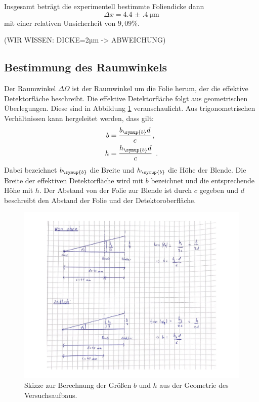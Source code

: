 Insgesamt beträgt die experimentell bestimmte Foliendicke dann
\begin{equation*}
  \Delta x = \SI{4.4(4)}{\micro\metre}
\end{equation*}
mit einer relativen Unsicherheit von $9{,}09\%$.

(WIR WISSEN: DICKE=2µm -> ABWEICHUNG)

\subsection{Bestimmung des Raumwinkels}
\label{subsec:raumwinkel}

Der Raumwinkel $\Delta \Omega$ ist der Raumwinkel um die Folie herum, der die
effektive Detektorfläche beschreibt. Die effektive Detektorfläche folgt aus geometrischen
Überlegungen. Diese sind in Abbildung \ref{fig:skizze} veranschaulicht.
Aus trigonometrischen Verhältnissen kann hergeleitet werden, dass gilt:
\begin{align*}
  b &= \frac{b_{\symup{b}} d}{c} \,,\\
  h &= \frac{h_{\symup{b}} d}{c} \,.
\end{align*}
Dabei bezeichnet $b_{\symup{b}}$ die Breite und $h_{\symup{b}}$ die Höhe der Blende.
Die Breite der effektiven Detektorfläche wird mit $b$ bezeichnet und die entsprechende Höhe mit $h$.
Der Abstand von der Folie zur Blende ist durch $c$ gegeben und $d$ beschreibt den Abstand
der Folie und der Detektoroberfläche.
\begin{figure}[h]
  \centering
  \includegraphics[width=\textwidth]{images/skizze.pdf}
  \caption{Skizze zur Berechnung der Größen $b$ und $h$ aus der Geometrie des Versuchsaufbaus.}
  \label{fig:skizze}
\end{figure}

